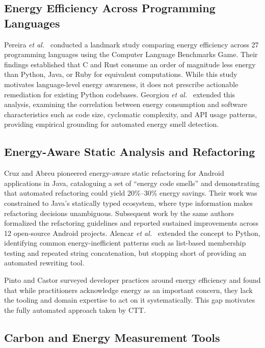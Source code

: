 \documentclass[conference]{IEEEtran}
\begin{document}
\subsection{Energy Efficiency Across Programming Languages}

Pereira \textit{et al.}\ \cite{ref7} conducted a landmark study comparing
energy efficiency across 27 programming languages using the Computer Language
Benchmarks Game.  Their findings established that C and Rust consume an
order of magnitude less energy than Python, Java, or Ruby for equivalent
computations.  While this study motivates language-level energy awareness, it
does not prescribe actionable remediation for existing Python codebases.
Georgiou \textit{et al.}\ \cite{ref18} extended this analysis, examining the
correlation between energy consumption and software characteristics such as
code size, cyclomatic complexity, and API usage patterns, providing empirical
grounding for automated energy smell detection.

\subsection{Energy-Aware Static Analysis and Refactoring}

Cruz and Abreu \cite{ref8} pioneered energy-aware static refactoring for
Android applications in Java, cataloguing a set of ``energy code smells''
and demonstrating that automated refactoring could yield 20\%--30\% energy
savings.  Their work was constrained to Java's statically typed ecosystem,
where type information makes refactoring decisions unambiguous.  Subsequent
work by the same authors \cite{ref12} formalized the refactoring guidelines
and reported sustained improvements across 12 open-source Android projects.
Alencar \textit{et al.}\ \cite{ref25} extended the concept to Python,
identifying common energy-inefficient patterns such as list-based membership
testing and repeated string concatenation, but stopping short of providing an
automated rewriting tool.

Pinto and Castor \cite{ref6} surveyed developer practices around energy
efficiency and found that while practitioners acknowledge energy as an
important concern, they lack the tooling and domain expertise to act on it
systematically.  This gap motivates the fully automated approach taken by CTT.

\subsection{Carbon and Energy Measurement Tools}
\end{document}
